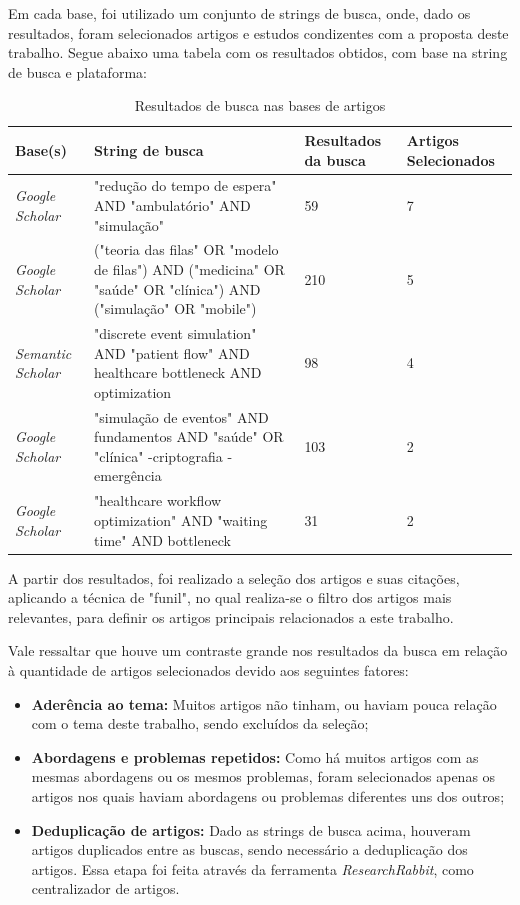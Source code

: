 \documentclass[
    12pt,                %
    openright,           %
    oneside,             %
    a4paper,             %
    english,             %
    brazil               %
]{abntex2}
\begin{document}
Em cada base, foi utilizado um conjunto de strings de busca, onde, dado os resultados, foram selecionados artigos e estudos condizentes com a proposta deste trabalho. Segue abaixo uma tabela com os resultados obtidos, com base na string de busca e plataforma:


\begin{table}[H]
	\centering
	\footnotesize
	\caption{Resultados de busca nas bases de artigos}
	\setlength{\tabcolsep}{4pt}
	\begin{tabularx}{\textwidth}{p{3cm}|p{7cm}|p{2cm}|p{2cm}}
		\toprule
		\textbf{Base(s)} & \textbf{String de busca} & \textbf{Resultados da busca} & \textbf{Artigos Selecionados} \\ 
		\midrule
		\textit{Google Scholar} & "redução do tempo de espera" AND "ambulatório" AND "simulação" & 59 & 7 \\ 
		\midrule
		\textit{Google Scholar} & ("teoria das filas" OR "modelo de filas") AND ("medicina" OR "saúde" OR "clínica") AND ("simulação" OR "mobile") & 210 & 5 \\ 
		\midrule
		\textit{Semantic Scholar} & "discrete event simulation" AND "patient flow" AND healthcare bottleneck AND optimization & 98 & 4 \\ 
		\midrule
		\textit{Google Scholar} & "simulação de eventos" AND fundamentos AND "saúde" OR "clínica" -criptografia -emergência & 103 & 2 \\ 
		\midrule
		\textit{Google Scholar} & "healthcare workflow optimization" AND "waiting time" AND bottleneck & 31 & 2 \\ 
		\bottomrule
	\end{tabularx}
	\label{tab:busca}
\end{table}

A partir dos resultados, foi realizado a seleção dos artigos e suas citações, aplicando a técnica de "funil", no qual realiza-se o filtro dos artigos mais relevantes, para definir os artigos principais relacionados a este trabalho.

Vale ressaltar que houve um contraste grande nos resultados da busca em relação à quantidade de artigos selecionados devido aos seguintes fatores:
\begin{itemize}
	\item \textbf{Aderência ao tema:} Muitos artigos não tinham, ou haviam pouca relação com o tema deste trabalho, sendo excluídos da seleção;
	\item \textbf{Abordagens e problemas repetidos:} Como há muitos artigos com as mesmas abordagens ou os mesmos problemas, foram selecionados apenas os artigos nos quais haviam abordagens ou problemas diferentes uns dos outros;
	\item \textbf{Deduplicação de artigos:} Dado as strings de busca acima, houveram artigos duplicados entre as buscas, sendo necessário a deduplicação dos artigos. Essa etapa foi feita através da ferramenta \textit{ResearchRabbit}, como centralizador de artigos.
\end{itemize}
\end{document}
